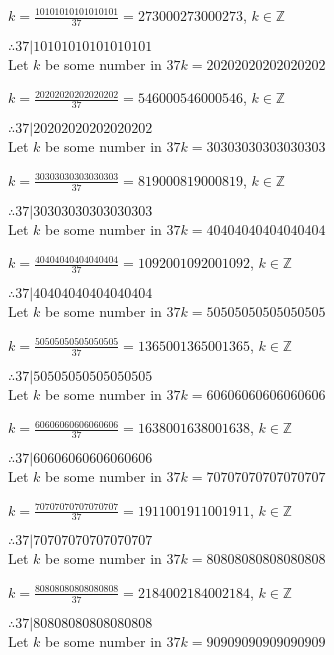 \documentclass{article}
\begin{document}
$k = \frac{10101010101010101}{37} = 273000273000273$, $k \in \mathbb{Z}$

$ \therefore  37|10101010101010101 $ \\

Let $k$ be some number in $37k = 20202020202020202$

$k = \frac{20202020202020202}{37} = 546000546000546$, $k \in \mathbb{Z}$

$ \therefore  37|20202020202020202 $ \\

Let $k$ be some number in $37k = 30303030303030303$

$k = \frac{30303030303030303}{37} = 819000819000819$, $k \in \mathbb{Z}$

$ \therefore  37|30303030303030303 $ \\

Let $k$ be some number in $37k = 40404040404040404$

$k = \frac{40404040404040404}{37} = 1092001092001092$, $k \in \mathbb{Z}$

$ \therefore  37|40404040404040404 $ \\

Let $k$ be some number in $37k = 50505050505050505$

$k = \frac{50505050505050505}{37} = 1365001365001365$, $k \in \mathbb{Z}$

$ \therefore  37|50505050505050505 $ \\

Let $k$ be some number in $37k = 60606060606060606$

$k = \frac{60606060606060606}{37} = 1638001638001638$, $k \in \mathbb{Z}$

$ \therefore  37|60606060606060606 $ \\

Let $k$ be some number in $37k = 70707070707070707$

$k = \frac{70707070707070707}{37} = 1911001911001911$, $k \in \mathbb{Z}$

$ \therefore  37|70707070707070707 $ \\

Let $k$ be some number in $37k = 80808080808080808$

$k = \frac{80808080808080808}{37} = 2184002184002184$, $k \in \mathbb{Z}$

$ \therefore  37|80808080808080808 $ \\

Let $k$ be some number in $37k = 90909090909090909$
\end{document}
